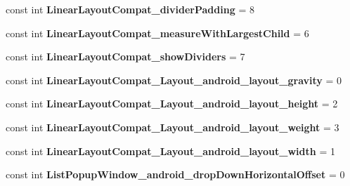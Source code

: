 \begin{DoxyCompactItemize}
\item 
\mbox{\label{classXaria_1_1Resource_1_1Styleable_a522ce9dbd281fca42286c566dd84647c}} 
const int {\bfseries Linear\+Layout\+Compat\+\_\+divider\+Padding} = 8
\item 
\mbox{\label{classXaria_1_1Resource_1_1Styleable_a882ec7a90e798304f7c2750889579140}} 
const int {\bfseries Linear\+Layout\+Compat\+\_\+measure\+With\+Largest\+Child} = 6
\item 
\mbox{\label{classXaria_1_1Resource_1_1Styleable_a8323026362c012639c8e74ee1a067111}} 
const int {\bfseries Linear\+Layout\+Compat\+\_\+show\+Dividers} = 7
\item 
\mbox{\label{classXaria_1_1Resource_1_1Styleable_aec1298ed1acc4b875223fdd172a6c808}} 
const int {\bfseries Linear\+Layout\+Compat\+\_\+\+Layout\+\_\+android\+\_\+layout\+\_\+gravity} = 0
\item 
\mbox{\label{classXaria_1_1Resource_1_1Styleable_a5233a942d7f7ea2066f0ec1ea8e7de17}} 
const int {\bfseries Linear\+Layout\+Compat\+\_\+\+Layout\+\_\+android\+\_\+layout\+\_\+height} = 2
\item 
\mbox{\label{classXaria_1_1Resource_1_1Styleable_a9a12cc78da6c7855ff6d12128a1b9c8d}} 
const int {\bfseries Linear\+Layout\+Compat\+\_\+\+Layout\+\_\+android\+\_\+layout\+\_\+weight} = 3
\item 
\mbox{\label{classXaria_1_1Resource_1_1Styleable_ad34b75bc0f12427653cf76aeff06e1a2}} 
const int {\bfseries Linear\+Layout\+Compat\+\_\+\+Layout\+\_\+android\+\_\+layout\+\_\+width} = 1
\item 
\mbox{\label{classXaria_1_1Resource_1_1Styleable_a5cd5ab420fb41cf152c5fda92d14bb3d}} 
const int {\bfseries List\+Popup\+Window\+\_\+android\+\_\+drop\+Down\+Horizontal\+Offset} = 0
\item 
\mbox{\label{classXaria_1_1Resource_1_1Styleable_ac9fcfdab709e31968afd92d4d9ed5654}} 

\end{DoxyCompactItemize}
